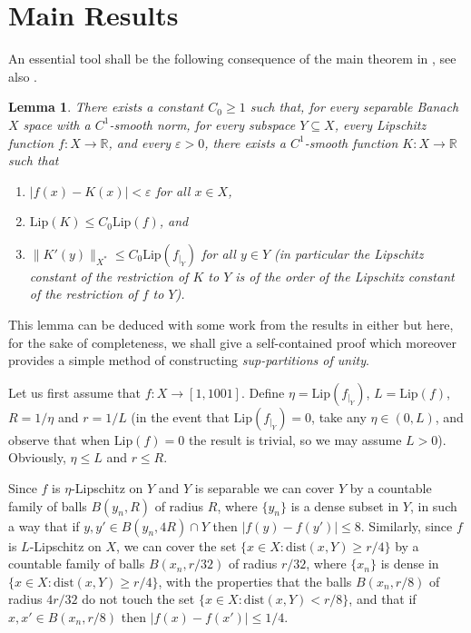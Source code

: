 \documentclass[11pt]{amsproc}%
\theoremstyle{plain}
\newtheorem{lemma}{Lemma}
\numberwithin{equation}{section}
\begin{document}
\medskip

\section{Main Results}

\noindent An essential tool shall be the following consequence of
the main theorem in \cite{F}, see also \cite{HJ}.
\begin{lemma}
\label{Main} There exists a constant $C_{0}\geq1$ such that, for
every separable Banach $X$ space with a $C^{1}$-smooth norm, for
every subspace $Y\subseteq X$, every Lipschitz function
$f:X\rightarrow\mathbb{R}$, and every $\varepsilon>0$, there
exists a $C^{1} $-smooth function $K:X\rightarrow\mathbb{R}$ such
that
\begin{enumerate}
\item $\left\vert f(x)-K(x)\right\vert <\varepsilon$ for all $x\in
X$,
\item $\textrm{Lip}(K)\leq C_0 \textrm{Lip}(f)$, and
\item $\|K'(y)\|_{X^{*}}\leq C_0 \textrm{Lip}(f_{|_Y})$ for all $y\in Y$ (in
particular the Lipschitz constant of the restriction of $K$ to $Y$
is of the order of the Lipschitz constant of the restriction of
$f$ to $Y$).
\end{enumerate}
\end{lemma}
\noindent This lemma can be deduced with some work from the
results in either \cite{F,HJ} but here, for the sake of
completeness, we shall give a self-contained proof which moreover
provides a simple method of constructing {\em sup-partitions of
unity}.

\medskip

 Let us first assume that
$f:X\to [1,1001]$. Define $\eta=\textrm{Lip}(f_{|_Y})$,
$L=\textrm{Lip}(f)$, $R=1/\eta$ and $r=1/L$ (in the event that
$\textrm{Lip}(f_{|_Y})=0$, take any $\eta\in (0,L)$, and observe
that when $\textrm{Lip}(f)=0$ the result is trivial, so we may
assume $L>0$). Obviously, $\eta\leq L$ and $r\leq R$.

Since $f$ is $\eta$-Lipschitz on $Y$ and $Y$ is separable we can
cover $Y$ by a countable family of balls $B(y_n, R)$ of radius
$R$, where $\{y_n\}$ is a dense subset in $Y$, in such a way that
if $y, y'\in B(y_n, 4R)\cap Y$ then $|f(y)-f(y')|\leq 8$.
Similarly, since $f$ is $L$-Lipschitz on $X$, we can cover the set
$\{x\in X: \textrm{dist}(x, Y)\geq r/4\}$ by a countable family of
balls $B(x_n, r/32)$ of radius $r/32$, where $\{x_n\}$ is dense in
$\{x\in X: \textrm{dist}(x, Y)\geq r/4\}$, with the properties
that the balls $B(x_n, r/8)$ of radius $4r/32$ do not touch the
set $\{x\in X: \textrm{dist}(x, Y)< r/8\}$, and that if $x, x'\in
B(x_n, r/8)$ then $|f(x)-f(x')|\leq 1/4$.
\end{document}
